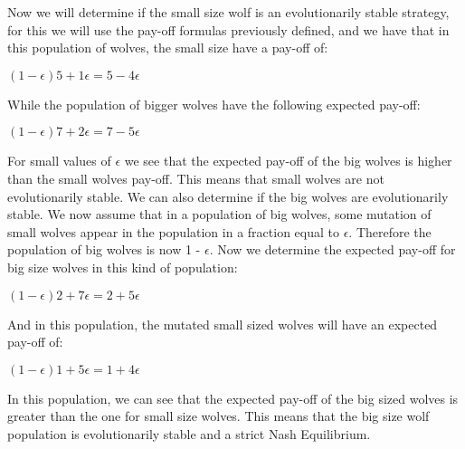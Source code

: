 \documentclass{article}
\begin{document}
Now we will determine if the small size wolf is an evolutionarily stable strategy, for this we will use the pay-off formulas previously defined, and we have that in this population of wolves, the small size have a pay-off of:
\begin{center}
$(1-{\epsilon})5 + 1{\epsilon} = 5 - 4{\epsilon}$
\end{center}
While the population of bigger wolves have the following expected pay-off:
\begin{center}
$(1-{\epsilon})7 + 2{\epsilon} = 7 - 5{\epsilon}$
\end{center}
For small values of $\epsilon$ we see that the expected pay-off of the big wolves is higher than the small wolves pay-off.  This means that small wolves are not evolutionarily stable.
We can also determine if the big wolves are evolutionarily stable. We now assume that in a population of big wolves, some mutation of small wolves appear in the population in a fraction equal to $\epsilon$. Therefore the population of big wolves is now 1 - $\epsilon$. Now we determine the expected pay-off for big size wolves in this kind of population:
 \begin{center}
$(1-{\epsilon})2 + 7{\epsilon} = 2 + 5{\epsilon}$
\end{center}
And in this population, the mutated small sized wolves will have an expected pay-off of:
\begin{center}
$(1-{\epsilon})1 + 5{\epsilon} = 1 + 4{\epsilon}$
\end{center}
In this population, we can see that the expected pay-off of the big sized wolves is greater than the one for small size wolves. This means that the big size wolf population is evolutionarily stable and a strict Nash Equilibrium.
\end{document}
